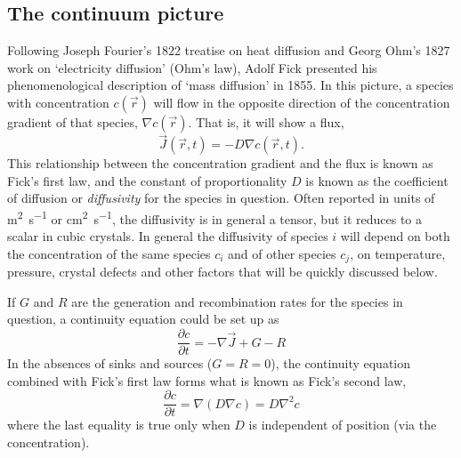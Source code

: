 \documentclass[11pt,bibliography=totoc,index=totoc]{scrbook}   %
\begin{document}
\subsection{The continuum picture}

Following Joseph Fourier's 1822 treatise on heat diffusion\cite{Fourier:1822} and Georg Ohm's 1827 work on `electricity diffusion' (Ohm's law),\cite{Ohm:1827} Adolf Fick presented his phenomenological description of `mass diffusion' in 
1855.\cite{Fick:1855}
In this picture, a species with concentration $c(\vec{r})$ will flow in the opposite direction of the concentration gradient of that species, $\nabla c(\vec{r})$. That is, it will show a flux,
\begin{equation}
  \vec{J}(\vec{r},t) = - D \nabla c(\vec{r},t).
  \label{eq:ficks1st}
\end{equation}
This relationship between the concentration gradient and the flux is known as Fick's first law, and the constant of proportionality $D$ is known as the coefficient of diffusion or \emph{diffusivity} for the species in question. 
Often reported in units of \si{\metre\squared\per\second} or \si{\centi\metre\squared\per\second}, the diffusivity is in general a tensor, but it reduces to a scalar in cubic crystals. 
In general the diffusivity of species $i$ will depend on both the concentration of the same species $c_i$ and of other species $c_j$, on temperature, pressure, crystal defects and other factors that will be quickly discussed below.

If $G$ and $R$ are the generation and recombination rates for the species in question, a continuity equation could be set up as
\begin{equation}
    \frac{\partial c}{\partial t} = -\nabla \vec{J} + G - R
  \label{eq:continuity}
\end{equation}
In the absences of sinks and sources ($G=R=0$), the continuity equation combined with Fick's first law forms what is known as Fick's second law,
\begin{equation}
    \frac{\partial c}{\partial t} = \nabla (D \nabla c) = D \nabla^2 c
  \label{eq:ficks2nd}
\end{equation}
where the last equality is true only when $D$ is independent of position (via the concentration).
\end{document}
